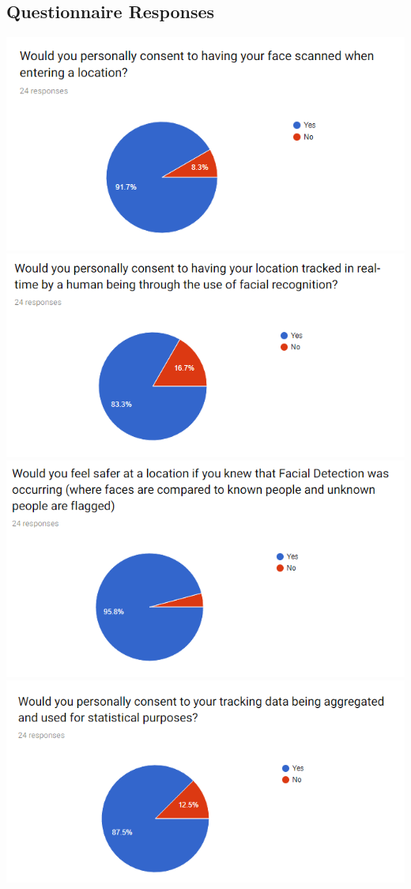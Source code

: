 \documentclass[
  english,
  a4paper,
,tablecaptionabove
]{scrartcl}
\begin{document}
\hypertarget{questionnaire-responses}{%
\subsection{Questionnaire Responses}\label{questionnaire-responses}}

\includegraphics{images/ppm-images/form-1.png}
\includegraphics{images/ppm-images/form-2.png}
\includegraphics{images/ppm-images/form-3.png}
\includegraphics{images/ppm-images/form-4.png}
\end{document}

